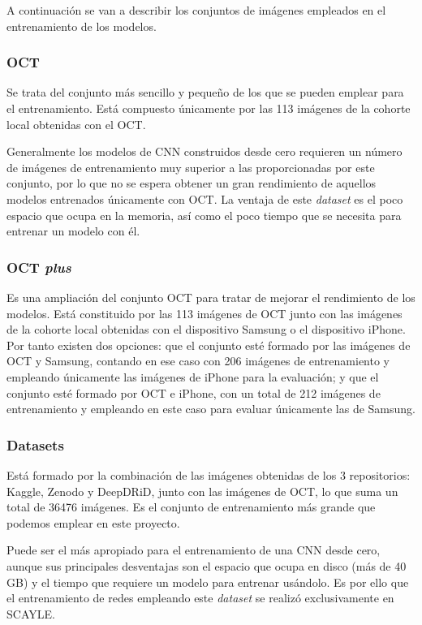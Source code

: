 A continuación se van a describir los conjuntos de imágenes empleados en el entrenamiento de los modelos.

\subsubsection{OCT}

Se trata del conjunto más sencillo y pequeño de los que se pueden emplear para el entrenamiento. Está compuesto únicamente por las 113 imágenes de la cohorte local obtenidas con el OCT.

Generalmente los modelos de CNN construidos desde cero requieren un número de imágenes de entrenamiento muy superior a las proporcionadas por este conjunto, por lo que no se espera obtener un gran rendimiento de aquellos modelos entrenados únicamente con OCT. La ventaja de este \textit{dataset} es el poco espacio que ocupa en la memoria, así como el poco tiempo que se necesita para entrenar un modelo con él.

\subsubsection{OCT \textit{plus}}

Es una ampliación del conjunto OCT para tratar de mejorar el rendimiento de los modelos. Está constituido por las 113 imágenes de OCT junto con las imágenes de la cohorte local obtenidas con el dispositivo Samsung o el dispositivo iPhone. Por tanto existen dos opciones: que el conjunto esté formado por las imágenes de OCT y Samsung, contando en ese caso con 206 imágenes de entrenamiento y empleando únicamente las imágenes de iPhone para la evaluación; y que el conjunto esté formado por OCT e iPhone, con un total de 212 imágenes de entrenamiento y empleando en este caso para evaluar únicamente las de Samsung.

\subsubsection{Datasets}

Está formado por la combinación de las imágenes obtenidas de los 3 repositorios: Kaggle, Zenodo y DeepDRiD, junto con las imágenes de OCT, lo que suma un total de 36476 imágenes. Es el conjunto de entrenamiento más grande que podemos emplear en este proyecto.

Puede ser el más apropiado para el entrenamiento de una CNN desde cero, aunque sus principales desventajas son el espacio que ocupa en disco (más de 40 GB) y el tiempo que requiere un modelo para entrenar usándolo. Es por ello que el entrenamiento de redes empleando este \textit{dataset} se realizó exclusivamente en SCAYLE.

